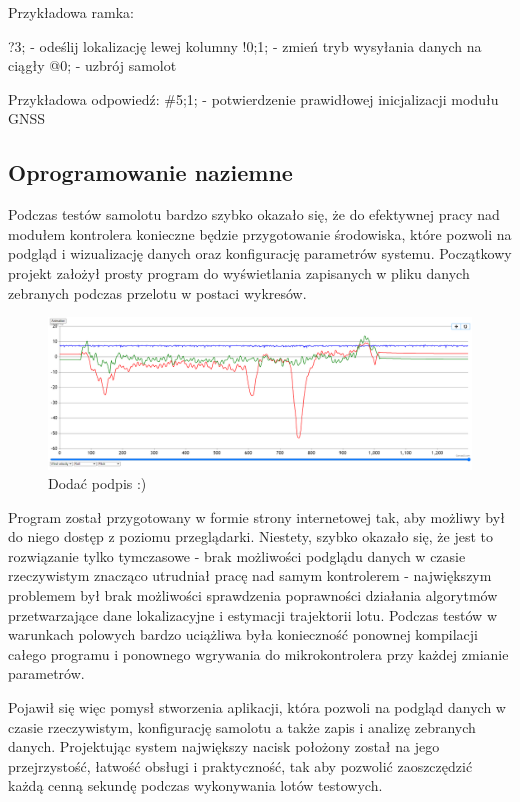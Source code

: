 \documentclass[12pt, a4paper]{article}
\begin{document}
Przykładowa ramka: 

?3;  - odeślij lokalizację lewej kolumny
!0;1; - zmień tryb wysyłania danych na ciągły
@0; - uzbrój samolot

Przykładowa odpowiedź:
\#5;1; - potwierdzenie prawidłowej inicjalizacji modułu GNSS
\FloatBarrier
\subsection{Oprogramowanie naziemne}
Podczas testów samolotu bardzo szybko okazało się, że do efektywnej pracy nad modułem kontrolera konieczne będzie przygotowanie środowiska, które pozwoli na podgląd i wizualizację danych oraz konfigurację parametrów systemu. Początkowy projekt założył prosty program do wyświetlania zapisanych w pliku danych zebranych podczas przelotu w postaci wykresów.

 \begin{figure}[ht]
    \centering
    \includegraphics[width=1\textwidth]{starysystem}
    \caption{Dodać podpis :)}
\end{figure}

Program został przygotowany w formie strony internetowej tak, aby możliwy był do niego dostęp z poziomu przeglądarki. Niestety, szybko okazało się, że jest to rozwiązanie tylko tymczasowe - brak możliwości podglądu danych w czasie rzeczywistym znacząco utrudniał pracę nad samym kontrolerem - największym problemem był brak możliwości sprawdzenia poprawności działania algorytmów przetwarzające dane lokalizacyjne i estymacji trajektorii lotu. Podczas testów w warunkach polowych bardzo uciążliwa była konieczność ponownej kompilacji całego programu i ponownego wgrywania do mikrokontrolera przy każdej zmianie parametrów. 

Pojawił się więc pomysł stworzenia aplikacji, która pozwoli na podgląd danych w czasie rzeczywistym, konfigurację samolotu a także zapis i analizę zebranych danych. Projektując system największy nacisk położony został na jego przejrzystość, łatwość obsługi i praktyczność, tak aby pozwolić zaoszczędzić każdą cenną sekundę podczas wykonywania lotów testowych. 
\end{document}
